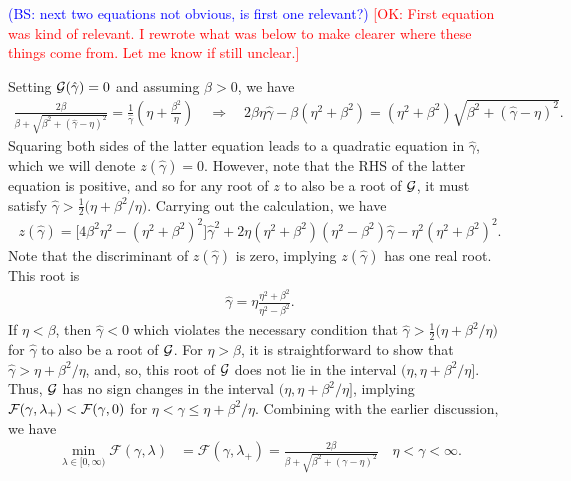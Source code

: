 \documentclass[a4paper,10pt]{article}
\newcommand{\tcb}{\textcolor{blue}}
\newcommand{\tcr}{\textcolor{red}}
\begin{document}
\tcb{(BS: next two equations not obvious, is first one relevant?)} \tcr{[OK: First equation was kind of relevant. I rewrote what was below to make clearer where these things come from. Let me know if still unclear.]}

Setting ${\cal G}(\hat{\gamma}) = 0$ and assuming $\beta > 0$, we have
\begin{align*}
\frac{2\beta}{\beta + \sqrt{\beta^2 + (\hat{\gamma}-\eta)^2}} 
=
\frac{1}{\hat{\gamma}} \left(\eta + \frac{\beta^2}{\eta} \right) 
\quad \Longrightarrow \quad
2\beta \eta \hat{\gamma} -\beta(\eta^2 + \beta^2) 
= 
(\eta^2 + \beta^2) \sqrt{\beta^2 + (\hat{\gamma}-\eta)^2}. 
\end{align*}
Squaring both sides of the latter equation leads to a quadratic equation in $\hat{\gamma}$, which we will denote $z(\hat{\gamma}) = 0$. However, note that the RHS of the latter equation is positive, and so for any root of $z$ to also be a root of ${\cal G}$, it must satisfy $\hat{\gamma} > \tfrac{1}{2} \big( \eta + \beta^2 / \eta)$. Carrying out the calculation, we have
\begin{align*}
z(\hat{\gamma}) = \big[ 4 \beta^2 \eta^2 - (\eta^2 + \beta^2)^2 \big] \hat{\gamma}^2 + 2 \eta (\eta^2 + \beta^2)(\eta^2 - \beta^2) \hat{\gamma} - \eta^2(\eta^2 + \beta^2)^2.
\end{align*}
%
Note that the discriminant of $z(\hat{\gamma})$ is zero, implying
$z(\hat{\gamma})$ has one real root. This root is
%
\begin{align} \label{eq:gamma_hat}
\hat{\gamma} = \eta \frac{\eta^2 + \beta^2}{\eta^2 - \beta^2}. 
\end{align}
%
If $\eta < \beta$, then $\hat{\gamma} < 0$ which violates the necessary condition that $\hat{\gamma} > \tfrac{1}{2} \big( \eta + \beta^2 / \eta)$ for $\hat{\gamma}$ to also be a root of ${\cal G}$. For $\eta > \beta$, it is straightforward to show that
$\hat{\gamma} > \eta+\beta^2/\eta$, and, so, this root of ${\cal G}$ does not lie in the interval $(\eta,\eta+\beta^2/\eta]$. Thus, ${\cal G}$ has no sign changes
in the interval $(\eta,\eta+\beta^2/\eta]$, implying
${\cal F} (\gamma, \lambda_+) < {\cal F}(\gamma, 0)$ for $\eta < \gamma
\leq \eta + \beta^2/\eta.$ Combining with the earlier discussion, we have
%
\begin{align*}
\min_{\lambda\in[0,\infty)} \mathcal{F}(\gamma,\lambda) &=
	\mathcal{F}(\gamma,\lambda_+) =
\frac{2\beta}{\beta + \sqrt{\beta^2 + (\gamma-\eta)^2}}
	\quad \eta < \gamma < \infty.
\end{align*}
%
\end{document}
